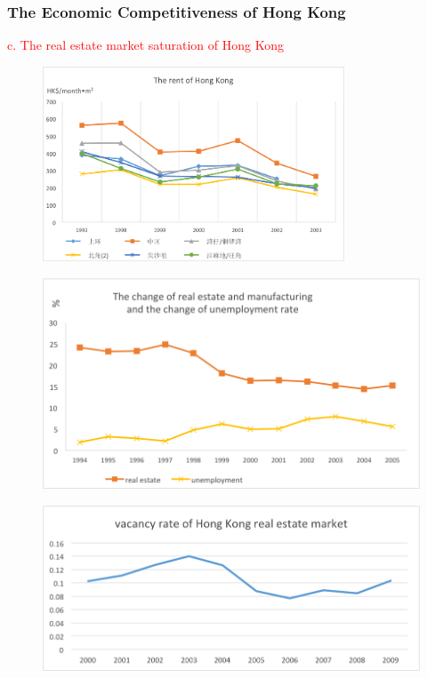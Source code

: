 \documentclass[slidestop,uncompress,mathsans, 12pt]{beamer}
\begin{document}
\begin{frame}
\frametitle{The Economic Competitiveness of Hong Kong}
\textcolor{red}{c. The real estate market saturation of Hong Kong}
\begin{overprint}
\begin{figure}[h]
\centering
\includegraphics[width=0.8\textwidth]{hk18.png}
\label{threadsVsSync}
\end{figure}
\begin{figure}[h]
\centering
\includegraphics[width=1\textwidth]{hk19.png}
\label{threadsVsSync}
\end{figure}
\begin{figure}[h]
\centering
\includegraphics[width=1\textwidth]{hk20.png}
\label{threadsVsSync}
\end{figure}
\end{overprint}
\end{frame}
\end{document}
